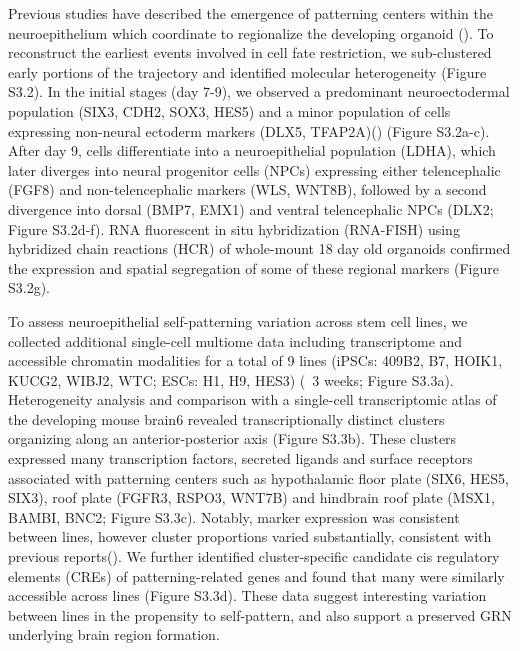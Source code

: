 Previous studies have described the emergence of patterning centers within the neuroepithelium which coordinate to regionalize the developing organoid (\cite{renner_self-organized_2017}). To reconstruct the earliest events involved in cell fate restriction, we sub-clustered early portions of the trajectory and identified molecular heterogeneity (Figure S3.2). In the initial stages (day 7-9), we observed a predominant neuroectodermal population (SIX3, CDH2, SOX3, HES5) and a minor population of cells expressing non-neural ectoderm markers (DLX5, TFAP2A)(\cite{mittnenzweig_single-embryo_2021,ealy_single-cell_2016}) (Figure S3.2a-c). After day 9, cells differentiate into a neuroepithelial population (LDHA), which later diverges into neural progenitor cells (NPCs) expressing either telencephalic (FGF8) and non-telencephalic markers (WLS, WNT8B), followed by a second divergence into dorsal (BMP7, EMX1) and ventral telencephalic NPCs (DLX2; Figure S3.2d-f). RNA fluorescent in situ hybridization (RNA-FISH) using hybridized chain reactions (HCR) of whole-mount 18 day old organoids confirmed the expression and spatial segregation of some of these regional markers (Figure S3.2g).

To assess neuroepithelial self-patterning variation across stem cell lines, we collected additional single-cell multiome data including transcriptome and accessible chromatin modalities for a total of 9 lines (iPSCs: 409B2, B7, HOIK1, KUCG2, WIBJ2, WTC; ESCs: H1, H9, HES3) (~3 weeks; Figure S3.3a). Heterogeneity analysis and comparison with a single-cell transcriptomic atlas of the developing mouse brain6 revealed transcriptionally distinct clusters organizing along an anterior-posterior axis (Figure S3.3b). These clusters expressed many transcription factors, secreted ligands and surface receptors associated with patterning centers such as hypothalamic floor plate (SIX6, HES5, SIX3), roof plate (FGFR3, RSPO3, WNT7B) and hindbrain roof plate (MSX1, BAMBI, BNC2; Figure S3.3c). Notably, marker expression was consistent between lines, however cluster proportions varied substantially, consistent with previous reports(\cite{kanton_organoid_2019}). We further identified cluster-specific candidate cis regulatory elements (CREs) of patterning-related genes and found that many were similarly accessible across lines (Figure S3.3d). These data suggest interesting variation between lines in the propensity to self-pattern, and also support a preserved GRN underlying brain region formation.

